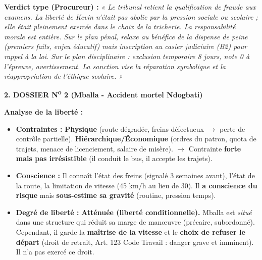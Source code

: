 \documentclass[11pt]{article}
\begin{document}
\begin{exoresolu}
\medskip
\noindent\textbf{Verdict type (Procureur) :} \textit{« Le tribunal retient la qualification de fraude aux examens. La liberté de Kevin n'était pas abolie par la pression sociale ou scolaire ; elle était pleinement exercée dans le choix de la tricherie. La responsabilité morale est entière. Sur le plan pénal, relaxe au bénéfice de la dispense de peine (premiers faits, enjeu éducatif) mais inscription au casier judiciaire (B2) pour rappel à la loi. Sur le plan disciplinaire : exclusion temporaire 8 jours, note 0 à l'épreuve, avertissement. La sanction vise la réparation symbolique et la réappropriation de l'éthique scolaire. »}

\bigskip
\noindent\textbf{2. DOSSIER N\textsuperscript{o} 2 (Mballa - Accident mortel Ndogbati)}

\medskip
\noindent\textbf{Analyse de la liberté :}
\begin{itemize}
    \item \textbf{Contraintes :} \textbf{Physique} (route dégradée, freins défectueux $\rightarrow$ perte de contrôle partielle). \textbf{Hiérarchique/Économique} (ordres du patron, quota de trajets, menace de licenciement, salaire de misère). $\rightarrow$ Contrainte \textbf{forte mais pas irrésistible} (il conduit le bus, il accepte les trajets).
    \item \textbf{Conscience :} Il connaît l'état des freins (signalé 3 semaines avant), l'état de la route, la limitation de vitesse (45 km/h au lieu de 30). Il \textbf{a conscience du risque} mais \textbf{sous-estime sa gravité} (routine, pression temps).
    \item \textbf{Degré de liberté :} \textbf{Atténuée (liberté conditionnelle).} Mballa est \textit{situé} dans une structure qui réduit sa marge de manœuvre (précaire, subordonné). Cependant, il garde la \textbf{maîtrise de la vitesse} et le \textbf{choix de refuser le départ} (droit de retrait, Art. 123 Code Travail : danger grave et imminent). Il n'a pas exercé ce droit.
\end{itemize}


\end{exoresolu}
\end{document}
